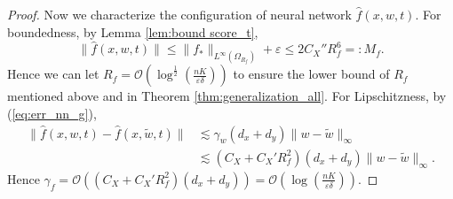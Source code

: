 \documentclass{article}
\numberwithin{equation}{section}
\def\eqref#1{equation~\ref{#1}}
\theoremstyle{definition}
\renewcommand{\eqref}[1]{(\ref{#1})}
\begin{document}
\begin{proof}
    Now we characterize the configuration of neural network $\widehat{f}(x,w,t)$.
    For boundedness, by Lemma \ref{lem:bound score_t},
    \begin{equation}
        \|\widehat{f}(x,w,t)\|\leq \|f_*\|_{L^\infty(\Omega_{R_f})}+\varepsilon\leq 2C_X''R_f^6=:M_f.
    \end{equation}
    Hence we can let $R_f=\mathcal{O}\left(\log^{\frac{1}{2}}\left(\frac{nK}{\varepsilon\delta}\right)\right)$ to ensure the lower bound of $R_f$ mentioned above and in Theorem \ref{thm:generalization_all}.
    For Lipschitzness, by \eqref{eq:err_nn_g},
    \begin{equation}
        \begin{aligned}
            \|\widehat{f}(x,w,t)-\widehat{f}(x,\widetilde{w},t)\|
            &\lesssim \gamma_w(d_x+d_y)\|w-\widetilde{w}\|_{\infty} \\
            &\lesssim (C_X+C_X'R_f^2)(d_x+d_y)\|w-\widetilde{w}\|_{\infty}.
        \end{aligned}
    \end{equation}
    Hence $\gamma_f=\mathcal{O}\left((C_X+C_X'R_f^2)(d_x+d_y)\right)=\mathcal{O}\left(\log\left(\frac{nK}{\varepsilon\delta}\right)\right)$.
    

\end{proof}
\end{document}
